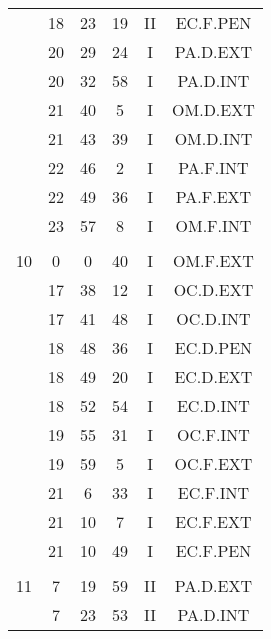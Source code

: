 \documentclass[12pt, a4paper]{article}
\begin{document}
\begin{multicols}{3}
{\begin{tabular}{c c c c c c}
	 	 	 	 & 18 & 23 & 19 & II & EC.F.PEN\\%
	 	 	 	 & 20 & 29 & 24 & I & PA.D.EXT\\%
	 	 	 	 & 20 & 32 & 58 & I & PA.D.INT\\%
	 	 	 	 & 21 & 40 & 5 & I & OM.D.EXT\\%
	 	 	 	 & 21 & 43 & 39 & I & OM.D.INT\\%
	 	 	 	 & 22 & 46 & 2 & I & PA.F.INT\\%
	 	 	 	 & 22 & 49 & 36 & I & PA.F.EXT\\%
	 	 	 	 & 23 & 57 & 8 & I & OM.F.INT\\%
	 	 	 	 & & & & & \\%
	 	 	 	10 & 0 & 0 & 40 & I & OM.F.EXT\\%
	 	 	 	 & 17 & 38 & 12 & I & OC.D.EXT\\%
	 	 	 	 & 17 & 41 & 48 & I & OC.D.INT\\%
	 	 	 	 & 18 & 48 & 36 & I & EC.D.PEN\\%
	 	 	 	 & 18 & 49 & 20 & I & EC.D.EXT\\%
	 	 	 	 & 18 & 52 & 54 & I & EC.D.INT\\%
	 	 	 	 & 19 & 55 & 31 & I & OC.F.INT\\%
	 	 	 	 & 19 & 59 & 5 & I & OC.F.EXT\\%
	 	 	 	 & 21 & 6 & 33 & I & EC.F.INT\\%
	 	 	 	 & 21 & 10 & 7 & I & EC.F.EXT\\%
	 	 	 	 & 21 & 10 & 49 & I & EC.F.PEN\\%
	 	 	 	 & & & & & \\%
	 	 	 	11 & 7 & 19 & 59 & II & PA.D.EXT\\%
	 	 	 	 & 7 & 23 & 53 & II & PA.D.INT\\%

\end{tabular}}
\end{multicols}
\end{document}
